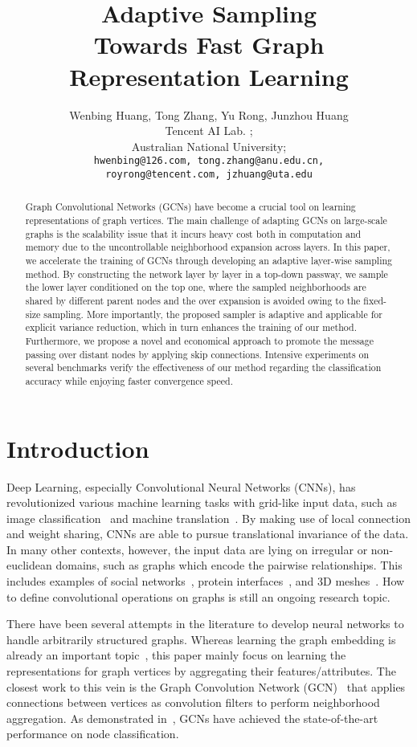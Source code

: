\documentclass{article}
\title{Adaptive Sampling \\ Towards Fast Graph Representation Learning}
\author{
Wenbing Huang, Tong Zhang, Yu Rong, Junzhou Huang \\
 Tencent AI Lab. ;\\
 Australian National University;\\
{\tt\small hwenbing@126.com, tong.zhang@anu.edu.cn,}\\
{\tt\small royrong@tencent.com, jzhuang@uta.edu}\\
}
\begin{document}
\maketitle

\begin{abstract}
Graph Convolutional Networks (GCNs) have become a crucial tool on learning representations of graph vertices. The main challenge of adapting GCNs on large-scale graphs is the scalability issue that it incurs heavy cost both in computation and memory due to the uncontrollable neighborhood expansion across layers. In this paper, we accelerate the training of GCNs through developing an adaptive layer-wise sampling method. By constructing the network layer by layer in a top-down passway, we sample the lower layer conditioned on the top one, where the sampled neighborhoods are shared by different parent nodes and the over expansion is avoided owing to the fixed-size sampling. More importantly, the proposed sampler is adaptive and applicable for explicit variance reduction, which in turn enhances the training of our method. Furthermore, we propose a novel and economical approach to promote the message passing over distant nodes by applying skip connections.
Intensive experiments on several benchmarks verify the effectiveness of our method regarding the classification accuracy while enjoying faster convergence speed.


\end{abstract}

\section{Introduction}
Deep Learning, especially Convolutional Neural Networks (CNNs), has revolutionized various machine learning tasks with grid-like input data, such as image classification~\cite{he2016deep} and machine translation~\cite{vaswani2017attention}. By making use of local connection and weight sharing, CNNs are able to pursue translational invariance of the data. In many other contexts, however, the input data are lying on irregular or non-euclidean domains, such as graphs which encode the pairwise relationships. This includes examples of social networks~\cite{hamilton2017inductive}, protein interfaces~\cite{fout2017}, and 3D meshes~\cite{qi2017pointnet}. How to define convolutional operations on graphs is still an ongoing research topic.

There have been several attempts in the literature to develop neural networks to handle arbitrarily structured graphs.
Whereas learning the graph embedding is already an important topic~\cite{perozzi2014deepwalk,tang2015line,grover2016node2vec}, this paper mainly focus on learning the representations for graph vertices by aggregating their features/attributes.  The closest work to this vein is the Graph Convolution Network (GCN)~\cite{kipf2016semi} that applies connections between vertices as convolution filters to perform neighborhood aggregation. As demonstrated in~\cite{kipf2016semi}, GCNs have achieved the state-of-the-art performance on node classification.
\end{document}
